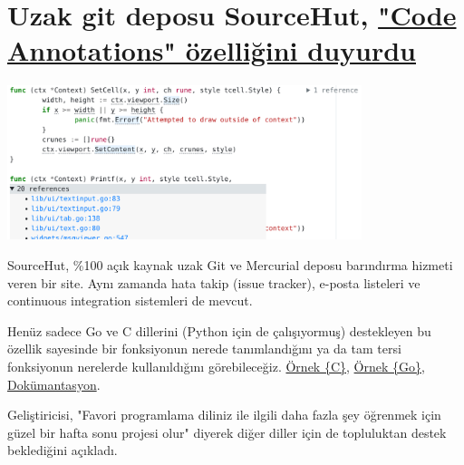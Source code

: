 \documentclass[11pt]{article}
\begin{document}
\section{Uzak git deposu SourceHut, \href{https://drewdevault.com/2019/07/08/Announcing-annotations-for-sourcehut.html}{"Code Annotations" özelliğini duyurdu}}
\label{sec:orgbe14b61}
\begin{center}
\includegraphics[height=4.5cm]{gorseller/sourcehut-ca.png}
\end{center}

SourceHut, \%100 açık kaynak uzak Git ve Mercurial deposu barındırma hizmeti
veren bir site. Aynı zamanda hata takip (issue tracker), e-posta listeleri ve
continuous integration sistemleri de mevcut.

Henüz sadece Go ve C dillerini (Python için de çalışıyormuş) destekleyen bu
özellik sayesinde bir fonksiyonun nerede tanımlandığını ya da tam tersi
fonksiyonun nerelerde kullanıldığını görebileceğiz. \href{https://git.sr.ht/\~mcf/cproc/tree/master/scan.c}{Örnek \{C\}}, \href{https://git.sr.ht/\~sircmpwn/aerc/tree/master/widgets/msgviewer.go}{Örnek \{Go\}},
\href{https://man.sr.ht/git.sr.ht/annotations.md}{Dokümantasyon}.

Geliştiricisi, "Favori programlama diliniz ile ilgili daha fazla şey öğrenmek
için güzel bir hafta sonu projesi olur" diyerek diğer diller için de
topluluktan destek beklediğini açıkladı.
\end{document}
